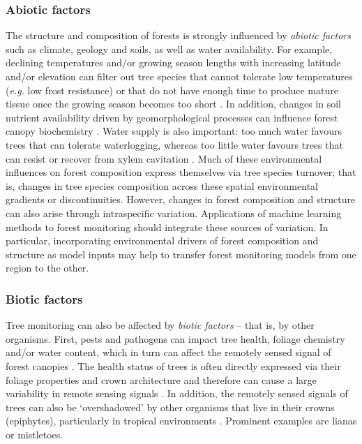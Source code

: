 \documentclass{CUP-JNL-DTM}%
\theoremstyle{definition}
\numberwithin{equation}{section}
\begin{document}
\subsubsection{Abiotic factors}
\label{sec:challenge_abiotic}
The structure and composition of forests is strongly influenced by \emph{abiotic factors} such as climate, geology and soils, as well as water availability. For example, declining temperatures and/or growing season lengths with increasing latitude and/or elevation can filter out tree species that cannot tolerate low temperatures (\textit{e.g.} low frost resistance) or that do not have enough time to produce mature tissue once the growing season becomes too short \cite{korner_where_2016}. In addition, changes in soil nutrient availability driven by geomorphological processes can influence forest canopy biochemistry \cite{chadwick_landscape_2018}. Water supply is also important: too much water favours trees that can tolerate waterlogging, whereas too little water favours trees that can resist or recover from xylem cavitation \cite{choat_global_2012}. Much of these environmental influences on forest composition express themselves via tree species turnover; that is, changes in tree species composition across these spatial environmental gradients or discontinuities. However, changes in forest composition and structure can also arise through intraspecific variation. 
Applications of machine learning methods to forest monitoring should integrate these sources of variation.
In particular, incorporating environmental drivers of forest composition and structure as model inputs may help to transfer forest monitoring models from one region to the other.


\subsubsection{Biotic factors} 
\label{sec:challenge_biotic}
Tree monitoring can also be affected by \emph{biotic factors} -- that is, by other organisms. First, pests and pathogens can impact tree health, foliage chemistry and/or water content, which in turn can affect the remotely sensed signal of forest canopies \cite{sapes_canopy_2022}. The health status of trees is often directly expressed via their foliage properties and crown architecture and therefore can cause a large variability in remote sensing signals \citep{zarco-tejada_previsual_2018, kattenborn2022anglecam}. In addition, the remotely sensed signals of trees can also be `overshadowed' by other organisms that live in their crowns (epiphytes), particularly in tropical environments \cite{baldeck_operational_2015}. Prominent examples are lianas or mistletoes.
\end{document}
